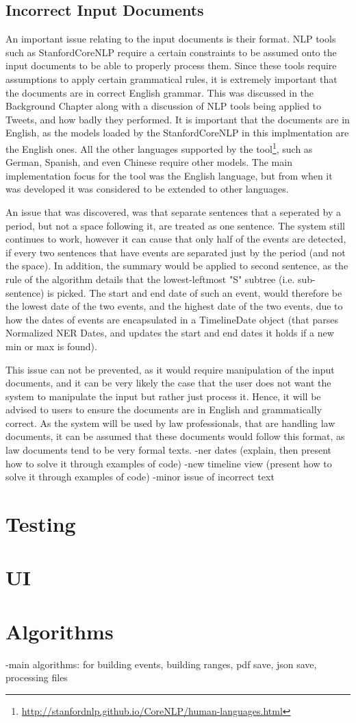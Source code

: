 \subsection{Incorrect Input Documents}
\par An important issue relating to the input documents is their format. NLP tools such as StanfordCoreNLP require a certain constraints to be assumed onto the input documents to be able to properly process them. Since these tools require assumptions to apply certain grammatical rules, it is extremely important that the documents are in correct English grammar. This was discussed in the Background Chapter along with a discussion of NLP tools being applied to Tweets, and how badly they performed. It is important that the documents are in English, as the models loaded by the StanfordCoreNLP in this implmentation are the English ones. All the other languages supported by the tool\footnote{\url{http://stanfordnlp.github.io/CoreNLP/human-languages.html}}, such as German, Spanish, and even Chinese require other models. The main implementation focus for the tool was the English language, but from when it was developed it was considered to be extended to other languages.
\par An issue that was discovered, was that separate sentences that a seperated by a period, but not a space following it, are treated as one sentence. The system still continues to work, however it can cause that only half of the events are detected, if every two sentences that have events are separated just by the period (and not the space). In addition, the summary would be applied to second sentence, as the rule of the algorithm details that the lowest-leftmost "S" subtree (i.e. sub-sentence) is picked. The start and end date of such an event, would therefore be the lowest date of the two events, and the highest date of the two events, due to how the dates of events are encapsulated in a TimelineDate object (that parses Normalized NER Dates, and updates the start and end dates it holds if a new min or max is found).
\par This issue can not be prevented, as it would require manipulation of the input documents, and it can be very likely the case that the user does not want the system to manipulate the input but rather just process it. Hence, it will be advised to users to ensure the documents are in English and grammatically correct. As the system will be used by law professionals, that are handling law documents, it can be assumed that these documents would follow this format, as law documents tend to be very formal texts.
-ner dates (explain, then present how to solve it through examples of code)
-new timeline view (present how to solve it through examples of code)
-minor issue of incorrect text
\section{Testing}
\section{UI}
\section{Algorithms}
-main algorithms: for building events, building ranges, pdf save, json save, processing files
